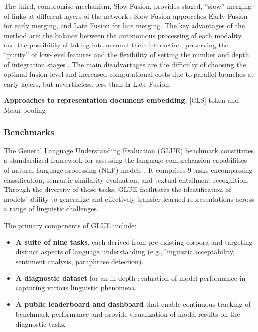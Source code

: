 The third, compromise mechanism, Slow Fusion, provides staged, “slow” merging of links at different layers of the network
\parencite{feichtenhofer2016convolutional, dutt2022shared}. Slow Fusion approaches Early Fusion for early merging, and Late Fusion
for late merging. The key advantages of the method are: the balance between the autonomous processing of each modality
and the possibility of taking into account their interaction, preserving the “purity” of low-level features and
the flexibility of setting the number and depth of integration stages \parencite{Karpathy_2014_CVPR}. The main disadvantages
are the difficulty of choosing the optimal fusion level and increased computational costs due to parallel branches
at early layers, but nevertheless, less than in Late Fusion.

\textbf{Approaches to representation document embedding.} [CLS] token and Mean-pooling

\subsubsection{Benchmarks}

The General Language Understanding Evaluation (GLUE) benchmark constitutes a standardized framework for assessing the language comprehension
capabilities of natural language processing (NLP) models \parencite{wang2018GLUE}. It comprises 9 tasks encompassing classification, semantic
similarity evaluation, and textual entailment recognition. Through the diversity of these tasks, GLUE facilitates the identification
of models' ability to generalize and effectively transfer learned representations across a range of linguistic challenges.

The primary components of GLUE include:

\begin{itemize}
    \item \textbf{A suite of nine tasks}, each derived from pre-existing corpora and targeting distinct aspects of language
    understanding (e.g., linguistic acceptability, sentiment analysis, paraphrase detection).
    \item \textbf{A diagnostic dataset} for an in-depth evaluation of model performance in capturing various linguistic phenomena.
    \item \textbf{A public leaderboard and dashboard} that enable continuous tracking of benchmark performance and provide
    visualization of model results on the diagnostic tasks.
\end{itemize}

